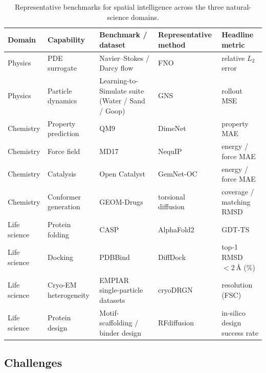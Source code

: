 \begin{table}[!th]
\centering
\fontsize{8}{10}\selectfont
\setlength{\tabcolsep}{1.0mm}
\caption{Representative benchmarks for spatial intelligence across the three natural-science domains.}
\label{tab:p4_s12_2_benchmarks}
\begin{tabular}{L{0.11\textwidth} L{0.17\textwidth} L{0.24\textwidth} L{0.19\textwidth} L{0.21\textwidth}}
\toprule
\textbf{Domain} & \textbf{Capability} & \textbf{Benchmark / dataset} & \textbf{Representative method} & \textbf{Headline metric} \\
\midrule
Physics & PDE surrogate & Navier--Stokes / Darcy flow & FNO~\cite{li2021fourier} & relative $L_2$ error \\
Physics & Particle dynamics & Learning-to-Simulate suite (Water / Sand / Goop) & GNS~\cite{sanchez2020learning} & rollout MSE \\
Chemistry & Property prediction & QM9~\cite{ramakrishnan2014quantum} & DimeNet~\cite{klicpera2020directional} & property MAE \\
Chemistry & Force field & MD17~\cite{chmiela2017machine} & NequIP~\cite{batzner2022e3} & energy / force MAE \\
Chemistry & Catalysis & Open Catalyst~\cite{chanussot2021open} & GemNet-OC~\cite{gasteiger2022gemnet} & energy / force MAE \\
Chemistry & Conformer generation & GEOM-Drugs~\cite{axelrod2022geom} & torsional diffusion~\cite{jing2022torsional} & coverage / matching RMSD \\
Life science & Protein folding & CASP~\cite{kryshtafovych2021critical} & AlphaFold2~\cite{jumper2021highly} & GDT-TS \\
Life science & Docking & PDBBind~\cite{wang2004pdbbind} & DiffDock~\cite{corso2023diffdock} & top-1 RMSD $<2$\,\AA{} (\%) \\
Life science & Cryo-EM heterogeneity & EMPIAR single-particle datasets & cryoDRGN~\cite{zhong2021cryodrgn} & resolution (FSC) \\
Life science & Protein design & Motif-scaffolding / binder design & RFdiffusion~\cite{watson2023novo} & in-silico design success rate \\
\bottomrule
\end{tabular}
\end{table}


\subsection{Challenges}
\label{subsec:p4-sec12-2-challenges}

